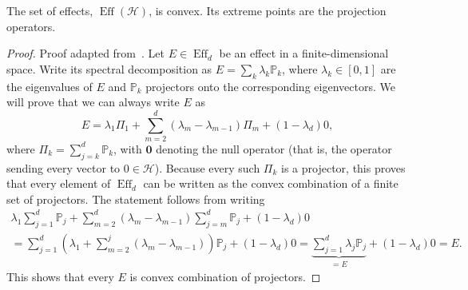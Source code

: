 \documentclass[12pt]{report}
\newcommand{\PP}{\mathbb{P}}
\newcommand{\on}[1]{\operatorname{#1}}
\newcommand{\bs}[1]{\boldsymbol{#1}}
\newcommand{\calH}{{\mathcal{H}}}
\begin{document}
\begin{prop}
	The set of effects, $\on{Eff}(\calH)$, is convex. Its extreme points are the projection operators.
\end{prop}
\begin{proof}
	Proof adapted from~\parencite{caves2004gleasontype}.
	Let $E\in\on{Eff}_d$ be an effect in a finite-dimensional space.
	Write its spectral decomposition as
	$E = \sum_k \lambda_k \PP_k$, where $\lambda_k\in[0,1]$ are the eigenvalues of $E$ and $\PP_k$ projectors onto the corresponding eigenvectors.
	We will prove that we can always write $E$ as
	\begin{equation}
		E = \lambda_1 \Pi_1 + \sum_{m=2}^d (\lambda_m-\lambda_{m-1})\Pi_m + (1-\lambda_d) 0,
	\end{equation}
	where $\Pi_k=\sum_{j=k}^d\PP_k$, with $\bs 0$ denoting the null operator (that is, the operator sending every vector to $0\in\calH$).
	Because every such $\Pi_k$ is a projector, this proves that every element of $\on{Eff}_d$ can be written as the convex combination of a finite set of projectors.
	The statement follows from writing
	\begin{equation}
	\begin{gathered}
		\lambda_1\sum_{j=1}^d \PP_j
		+ \sum_{m=2}^d(\lambda_m-\lambda_{m-1})\sum_{j=m}^d \PP_j
		+ (1-\lambda_d)0 \\
		= \sum_{j=1}^d \left(\lambda_1 + \sum_{m=2}^j (\lambda_m-\lambda_{m-1})\right) \PP_j
		+ (1-\lambda_d) 0
		= \underbrace{\sum_{j=1}^d \lambda_j \PP_j}_{=E} + (1-\lambda_d) 0 = E.
	\end{gathered}
	\end{equation}
	This shows that every $E$ is convex combination of projectors.


\end{proof}
\end{document}
